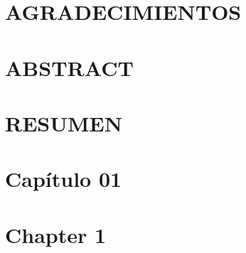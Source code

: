 \documentclass[pdftex,spanish]{pucthesis}	%
\begin{document}

 \label{acknowledgements} %
\chapter*{AGRADECIMIENTOS}


\cleardoublepage



\tableofcontents
{} \label{listoffigures}
\listoffigures
{} \label{listoftables}
\listoftables
\cleardoublepage



 \label{abstract}
\chapter*{ABSTRACT}

\cleardoublepage

 \label{resumen}
\chapter*{RESUMEN}

\cleardoublepage



\chapter[Capítulo 01]{Capítulo 01}


\chapter[CHAPTER 1]{Chapter 1} \label{ch1}

\end{document}
